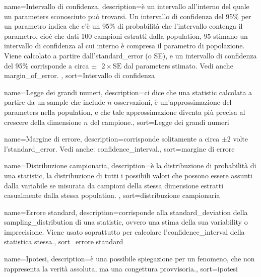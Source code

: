 {
	 name={Intervallo di confidenza},
	 description={\`e un intervallo all'interno del quale un \gls{parameters} sconosciuto pu\`o trovarsi. Un intervallo di confidenza del 95\% per un parametro indica che c'\`e un 95\% di probabilit\`a che l'intervallo contenga il parametro, cio\`e che dati 100 campioni estratti dalla \gls{population}, 95 stimano un intervallo di confidenza al cui interno \`e compresa il parametro di popolazione. Viene calcolato a partire dall'\gls{standard_error} (o SE), e un intervallo di confidenza del 95\% corrisponde a circa $\pm \text{ } 2 \times \text{SE}$ dal \gls{parameters} stimato. Vedi anche \gls{margin_of_error}. },
	 sort={Intervallo di confidenza}
}

{
	 name={Legge dei grandi numeri},
	 description={ci dice che una \gls{statistic} calcolata a partire da un \gls{sample} che include $n$ osservazioni, \`e un'approssimazione del \gls{parameters} nella \gls{population}, e che tale approssimazione diventa pi\`u precisa al crescere della dimensione $n$ del campione.},
	 sort={Legge dei grandi numeri}
}

{
	 name={Margine di errore},
	 description={corrisponde solitamente a circa $\pm 2$ volte l'\gls{standard_error}. Vedi anche: \gls{confidence_interval}.},
	 sort={margine di errore}
}

{
	 name={Distribuzione campionaria},
	 description={\`e la distribuzione di probabilit\`a di una \gls{statistic}, la distribuzione di tutti i possibili valori che possono essere assunti dalla variabile se misurata da campioni della stessa dimensione estratti casualmente dalla stessa \gls{population}. },
	 sort={distribuzione campionaria}
}


{
	 name={Errore standard},
	 description={corrisponde alla \gls{standard_deviation} della \gls{sampling_distribution} di una \gls{statistic}, ovvero una stima della sua \gls{variability} o imprecisione. Viene usato soprattutto per calcolare l'\gls{confidence_interval} della statistica stessa.},
	 sort={errore standard}
}



{
	 name={Ipotesi},
	 description={\`e una possibile spiegazione per un fenomeno, che non rappresenta la verit\`a assoluta, ma una congettura provvisoria.},
	 sort={ipotesi}
}

